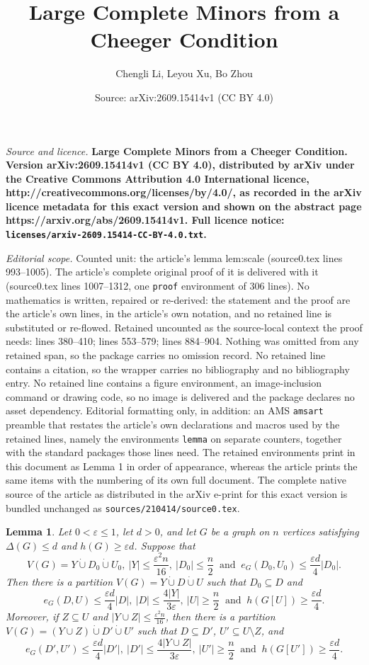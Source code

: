 \documentclass[10pt,a4paper]{amsart}
\title{\bf Large Complete Minors from a Cheeger Condition}
\author{Chengli Li, Leyou Xu, Bo Zhou}
\date{Source: arXiv:2609.15414v1 (CC BY 4.0)}
\newtheorem{lemma}{Lemma}
\newcommand{\eps}{\varepsilon}
\begin{document}
\maketitle

\noindent\emph{Source and licence.} \bf Large Complete Minors from a Cheeger Condition. Version arXiv:2609.15414v1 (CC BY 4.0), distributed by arXiv under the Creative Commons Attribution 4.0 International licence, http://creativecommons.org/licenses/by/4.0/, as recorded in the arXiv licence metadata for this exact version and shown on the abstract page https://arxiv.org/abs/2609.15414v1. Full licence notice: \texttt{licenses/arxiv-2609.15414-CC-BY-4.0.txt}.\par\smallskip

\noindent\textit{Editorial scope.} Counted unit: the article's lemma lem:scale (source0.tex lines 993--1005). The article's complete original proof of it is delivered with it (source0.tex lines 1007--1312, one \texttt{proof} environment of 306 lines). No mathematics is written, repaired or re-derived: the statement and the proof are the article's own lines, in the article's own notation, and no retained line is substituted or re-flowed.  Retained uncounted as the source-local context the proof needs: lines 380--410; lines 553--579; lines 884--904.  Nothing was omitted from any retained span, so the package carries no omission record.  No retained line contains a citation, so the wrapper carries no bibliography and no bibliography entry.  No retained line contains a figure environment, an image-inclusion command or drawing code, so no image is delivered and the package declares no asset dependency.  Editorial formatting only, in addition: an AMS \texttt{amsart} preamble that restates the article's own declarations and macros used by the retained lines, namely the environments \texttt{lemma} on separate counters, together with the standard packages those lines need.  The retained environments print in this document as Lemma 1 in order of appearance, whereas the article prints the same items with the numbering of its own full document.  The complete native source of the article as distributed in the arXiv e-print for this exact version is bundled unchanged as \texttt{sources/210414/source0.tex}.
\begin{lemma}\label{lem:remainder}
Let $0<\eps\le1$, let $d>0$, and let $G$ be a graph on $n$ vertices
satisfying $\Delta(G)\le d$ and $h(G)\ge\eps d$. Suppose that
\[
 V(G)=Y\mathbin{\dot\cup}D_0\mathbin{\dot\cup}U_0,
 \ |Y|\le\frac{\eps^2n}{16},
 \ |D_0|\le\frac{n}{2}
 \  \text{ and }\ e_G(D_0,U_0)\le\frac{\eps d}{4}|D_0|.
\]
Then there is a partition
$V(G)=Y\mathbin{\dot\cup}D\mathbin{\dot\cup}U$ such that
$D_0\subseteq D$ and
\[
 e_G(D,U)\le\frac{\eps d}{4}|D|,
 \ |D|\le\frac{4|Y|}{3\eps},
 \ |U|\ge\frac{n}{2}
 \ \text{ and } \  h(G[U])\ge\frac{\eps d}{4}.
\]
Moreover, if $Z\subseteq U$ and
$|Y\cup Z|\le\frac{\eps^2n}{16}$, then there is a partition
$
 V(G)=(Y\cup Z)\mathbin{\dot\cup}D'\mathbin{\dot\cup}U'
$
such that $D\subseteq D'$, $U'\subseteq U\setminus Z$, and
\[
 e_G(D',U')\le\frac{\eps d}{4}|D'|,
 \ |D'|\le\frac{4|Y\cup Z|}{3\eps},
 \ |U'|\ge\frac{n}{2}
 \ \text{ and }\  h(G[U'])\ge\frac{\eps d}{4}.
\]
\end{lemma}
\end{document}
